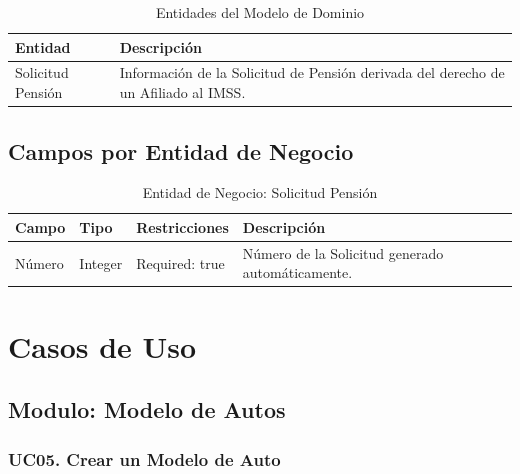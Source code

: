 \documentclass[10pt, letterpaper]{report}
\begin{document}
\begin{table}[h]
	\caption{Entidades del Modelo de Dominio}
	\label{tab:entities}
	\begin{center}
	\begin{tabular}{ l l }
		\hline
		\textbf{Entidad} & \textbf{Descripción} \\
		\hline
		Solicitud Pensión & Información de la Solicitud de Pensión derivada del derecho de un Afiliado al IMSS. \\
		\hline
	\end{tabular}
	\end{center}
\end{table}

\section{Campos por Entidad de Negocio} \label{sec:entity-fields}

\begin{table}[h]
	\caption{Entidad de Negocio: Solicitud Pensión}
	\label{tab:fields-solicitudpension}
	\begin{center}
	\begin{tabular}{ l l l l }
		\hline
		\textbf{Campo} & \textbf{Tipo} & \textbf{Restricciones} & \textbf{Descripción} \\
		\hline
		Número & Integer & Required: true & Número de la Solicitud generado automáticamente. \\
		\hline
	\end{tabular}
	\end{center}
\end{table}

\chapter{Casos de Uso}


%
%

\section{Modulo: Modelo de Autos} \label{sec:cumodeloautoservices}

\subsection{UC05. Crear un Modelo de Auto} \label{sec:cucrearmodeloauto}
\end{document}
